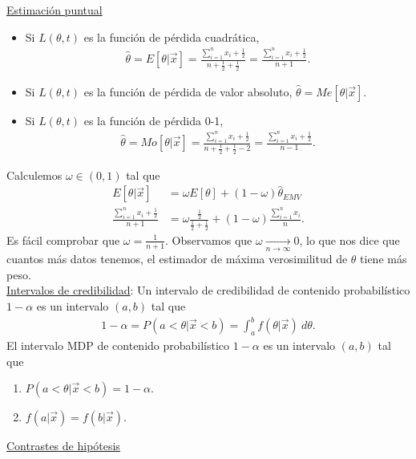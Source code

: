 \noindent \underline{Estimación puntual}
\begin{itemize}
    \item Si $L(\theta,t)$ es la función de pérdida cuadrática, 
    \begin{align*}
        \widehat{\theta} = E[\theta |  \vec{x}] = \frac{\sum_{i=1}^{n} x_i + \frac{1}{2}}{n + \frac{1}{2} + \frac{1}{2}} = \frac{\sum_{i=1}^{n} x_i + \frac{1}{2}}{n + 1}.
    \end{align*}
    \item Si $L(\theta,t)$ es la función de pérdida de valor absoluto, $\widehat{\theta} = Me[\theta | \vec{x}]$.
    \item Si $L(\theta,t)$ es la función de pérdida 0-1,
    \begin{align*}
        \widehat{\theta} = Mo[\theta | \vec{x}] = \frac{\sum_{i=1}^{n} x_i + \frac{1}{2}}{n + \frac{1}{2} +\frac{1}{2} - 2} = \frac{\sum_{i=1}^{n} x_i + \frac{1}{2}}{n - 1}.
    \end{align*}
\end{itemize}
Calculemos $\omega \in (0,1)$ tal que 
\begin{align*}
    E[\theta | \vec{x}] &= \omega E[\theta] + (1 - \omega) \widehat{\theta}_{EMV}  \\
    \frac{\sum_{i=1}^{n} x_i +\frac{1}{2}}{n + 1} &= \omega \frac{\frac{1}{2}}{\frac{1}{2} + \frac{1}{2}} + (1-\omega) \frac{\sum_{i=1}^{n} x_i}{n}.
\end{align*}
Es fácil comprobar que $\omega = \frac{1}{n+1}$. Observamos que $\omega \xrightarrow[n \to \infty]{} 0$, lo que nos dice que cuantos más datos tenemos, el estimador de máxima verosimilitud de $\theta$ tiene más peso.
\\
\newline
\noindent \underline{Intervalos de credibilidad}: Un intervalo de credibilidad de contenido probabilístico $1-\alpha$ es un intervalo $(a,b)$ tal que
\begin{align*}
    1 - \alpha = P(a < \theta | \vec{x} < b) = \int_{a}^{b} f(\theta | \vec{x}) \ d\theta.
\end{align*}
El intervalo MDP de contenido probabilístico $1-\alpha$ es un intervalo $(a,b)$ tal que
\begin{enumerate}
    \item $P(a < \theta | \vec{x} < b) = 1 - \alpha$.
    \item $f(a | \vec{x}) = f(b | \vec{x})$.
\end{enumerate}
\noindent \underline{Contrastes de hipótesis}

